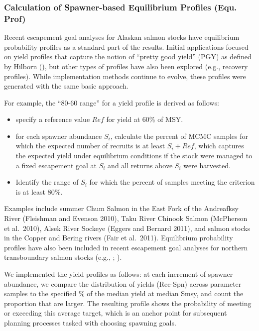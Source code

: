 \documentclass[french,11pt]{book}
\begin{document}
\subsubsection{Calculation of Spawner-based Equilibrium Profiles (Equ. Prof)}\label{EqProfilesMethods}

Recent escapement goal analyses for Alaskan salmon stocks have equilibrium probability profiles as a standard part of the results. Initial applications focused on yield profiles that capture the notion of ``pretty good yield'' (PGY) as defined by Hilborn (), but other types of profiles have also been explored (e.g., recovery profiles). While implementation methods continue to evolve, these profiles were generated with the same basic approach.

For example, the ``80-60 range'' for a yield profile is derived as follows:
\begin{itemize}

\item
  specify a reference value \(Ref\) for yield at 60\% of MSY.
\item
  for each spawner abundance \(S_i\), calculate the percent of MCMC samples for which the expected number of recruits is at least \(S_i + Ref\), which captures the expected yield under equilibrium conditions if the stock were managed to a fixed escapement goal at \(S_i\) and all returns above \(S_i\) were harvested.
\item
  Identify the range of \(S_i\) for which the percent of samples meeting the criterion is at least 80\%.
\end{itemize}
Examples include summer Chum Salmon in the East Fork of the Andreafksy River (Fleishman and Evenson 2010), Taku River Chinook Salmon (McPherson et al.~2010), Alsek River Sockeye (Eggers and Bernard 2011), and salmon stocks in the Copper and Bering rivers (Fair et al.~2011). Equilibrium probability profiles have also been included in recent escapement goal analyses for northern transboundary salmon stocks (e.g., ; ).

We implemented the yield profiles as follows: at each increment of spawner abundance, we compare the distribution of yields (Rec-Spn) across parameter samples to the specified \% of the median yield at median Smsy, and count the proportion that are larger. The resulting profile shows the probability of meeting or exceeding this average target, which is an anchor point for subsequent planning processes tasked with choosing spawning goals.
\end{document}

